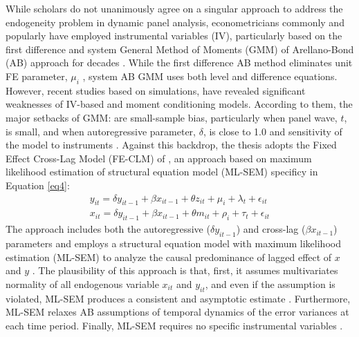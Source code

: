 While scholars do not unanimously agree on a singular approach to address the endogeneity problem in dynamic panel analysis, econometricians commonly and popularly have employed instrumental variables (IV), particularly based on the first difference and system General Method of Moments (GMM) of Arellano-Bond (AB) approach for decades \parencite[see][]{arellano1991some, alonso1999symmetrically, allison2017maximum}. While the first difference AB method eliminates unit FE parameter, $\mu_i$ \parencite{arellano1991some}, system AB GMM uses both level and difference equations. However, recent studies based on simulations, have revealed significant weaknesses of IV-based and moment conditioning models. According to them, the major setbacks of GMM: are small-sample bias, particularly when panel wave, $t$, is small, and when autoregressive parameter, $\delta$, is close to 1.0 and sensitivity of the model to instruments \parencite{allison2017maximum, seddig2020maximum, becker2023many}.  Against this backdrop, the thesis adopts the Fixed Effect Cross-Lag Model (FE-CLM) of \textcite{allison2017maximum}, an approach based on maximum likelihood estimation of structural equation model (ML-SEM) specificy in Equation \ref{eq4}:
\begin{equation}
\begin{split}
    y_{it} = \delta y_{it-1} + \beta x_{it-1} + \theta z_{it} + \mu_i + \lambda_t + \epsilon_{it}\\
 x_{it} = \delta y_{it-1} + \beta x_{it-1} + \theta m_{it} + \rho_i + \tau_t + \epsilon_{it}
 \end{split}
    \label{eq4}
\end{equation}
The approach includes both the autoregressive ($\delta y_{it-1}$) and cross-lag ($\beta x_{it-1}$) parameters and employs a structural equation model with maximum likelihood estimation (ML-SEM) to analyze the causal predominance of lagged effect of $x$ and $y$ \parencite{seddig2020maximum}. The plausibility of this approach is that, first, it assumes multivariates normality of all endogenous variable $x_{it}$ and $y_{it}$, and even if the assumption is violated, ML-SEM produces a consistent and asymptotic estimate \parencite{allison2017maximum}. Furthermore, ML-SEM relaxes AB assumptions of temporal dynamics of the error variances at each time period. Finally, ML-SEM requires no specific instrumental variables  \parencite{allison2017maximum, becker2023many, moral2019dynamic}. 






